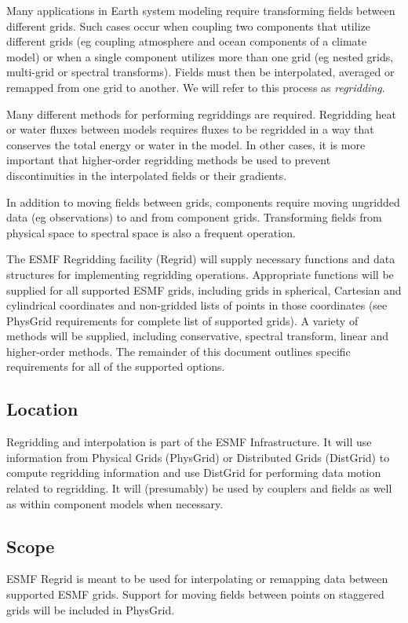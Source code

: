 
Many applications in Earth system modeling require
transforming fields between different grids.  Such
cases occur when coupling two components that utilize
different grids (eg coupling atmosphere and ocean
components of a climate model) or when a single component
utilizes more than one grid (eg nested grids, multi-grid
or spectral transforms).
Fields must then be interpolated, averaged or remapped
from one grid to another.  We will refer to this process
as {\em regridding}. 

Many different methods
for performing regriddings are required.
Regridding heat or water fluxes between models requires
fluxes to be regridded in a way that conserves
the total energy or water in the model.  In other
cases, it is more important that higher-order
regridding methods be used to prevent discontinuities
in the interpolated fields or their gradients.

In addition to moving fields between grids,
components require moving ungridded data (eg observations)
to and from component grids.  Transforming fields
from physical space to spectral space is also
a frequent operation.

The ESMF Regridding facility (Regrid) will
supply necessary functions and data structures for
implementing regridding operations.  Appropriate 
functions will be supplied for all supported ESMF grids,
including grids in spherical, Cartesian and cylindrical
coordinates and non-gridded lists of points
in those coordinates (see PhysGrid requirements for
complete list of supported grids).  A variety of methods will
be supplied, including conservative, spectral transform,
linear and higher-order methods.  The   
remainder of this document outlines specific requirements
for all of the supported options.

\subsection{Location}

Regridding and interpolation is part of the ESMF
Infrastructure.  It will use information from Physical
Grids (PhysGrid) or Distributed Grids (DistGrid) to compute
regridding information and use DistGrid
for performing data motion related to regridding.  It will
(presumably) be used by couplers and fields as well as
within component models when necessary.

\subsection{Scope}

ESMF Regrid is meant to be used for interpolating or
remapping data between supported ESMF grids.  Support
for moving fields between points on staggered grids
will be included in PhysGrid.

